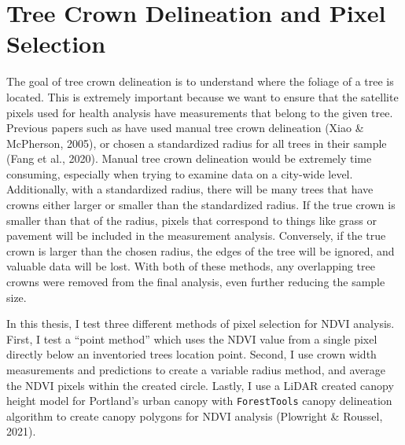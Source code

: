 \documentclass[12pt,twoside]{reedthesis}
\begin{document}
\hypertarget{tree-crown-delineation-and-pixel-selection}{%
\section{Tree Crown Delineation and Pixel Selection}\label{tree-crown-delineation-and-pixel-selection}}

The goal of tree crown delineation is to understand where the foliage of
a tree is located. This is extremely important because we want to ensure
that the satellite pixels used for health analysis have measurements
that belong to the given tree. Previous papers such as have used manual
tree crown delineation (Xiao \& McPherson, 2005), or chosen a standardized radius for
all trees in their sample (Fang et al., 2020). Manual tree crown delineation
would be extremely time consuming, especially when trying to examine
data on a city-wide level. Additionally, with a standardized radius,
there will be many trees that have crowns either larger or smaller than
the standardized radius. If the true crown is smaller than that of the
radius, pixels that correspond to things like grass or pavement will be
included in the measurement analysis. Conversely, if the true crown is
larger than the chosen radius, the edges of the tree will be ignored,
and valuable data will be lost. With both of these methods, any
overlapping tree crowns were removed from the final analysis, even
further reducing the sample size.

In this thesis, I test three different methods of pixel selection for
NDVI analysis. First, I test a ``point method'' which uses the NDVI value
from a single pixel directly below an inventoried trees location point.
Second, I use crown width measurements and predictions to create a
variable radius method, and average the NDVI pixels within the created
circle. Lastly, I use a LiDAR created canopy height model for Portland's
urban canopy with \texttt{ForestTools} canopy delineation algorithm to create
canopy polygons for NDVI analysis (Plowright \& Roussel, 2021).
\end{document}

